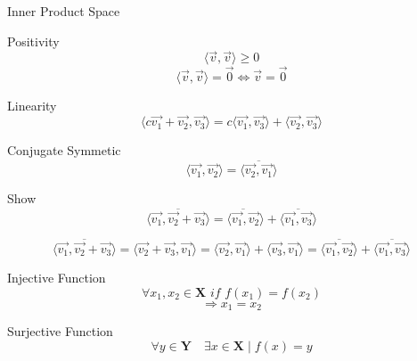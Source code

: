 \documentclass[10pt]{article}
\begin{document}
Inner Product Space

Positivity
$$\langle\vec{v}, \vec{v}\rangle \geq 0$$
$$\langle \vec{v} , \vec{v} \rangle = \vec{0} \iff \vec{v} = \vec{0}$$

Linearity 
$$\langle c\vec{v_1} + \vec{v_2}, \vec{v_3}\rangle = c\langle \vec{v_1}, \vec{v_3}\rangle + \langle\vec{v_2}, \vec{v_3} \rangle $$

Conjugate Symmetic 
$$\langle \vec{v_1}, \vec{v_2} \rangle = \overline{\langle \vec{v_2}, \vec{v_1} \rangle}$$


Show
$$\overline{\langle \vec{v_1} , \vec{v_2} + \vec{v_3} \rangle} = \overline{ \langle \vec{v_1} , \vec{v_2}} \rangle + \overline{ \langle \vec{v_1} , \vec{v_3} \rangle }$$

$$ \overline{\langle \vec{v_1} , \vec{v_2} + \vec{v_3} \rangle} = \langle \vec{v_2} + \vec{v_3} , \vec{v_1} \rangle = \langle \vec{v_2}, \vec{v_1} \rangle + \langle \vec{v_3}, \vec{v_1} \rangle = \overline{\langle \vec{v_1}, \vec{v_2} \rangle} + \overline{\langle \vec{v_1}, \vec{v_3} \rangle} $$


Injective Function
$$ \forall x_1, x_2 \in \mathbf{X}  \textit{ if } f(x_1) = f(x_2) $$
$$ \Rightarrow x_1 = x_2 $$

Surjective Function
$$ \forall y \in \mathbf{Y}\quad \exists x \in \mathbf{X} \mid f(x) = y  $$
\end{document}
